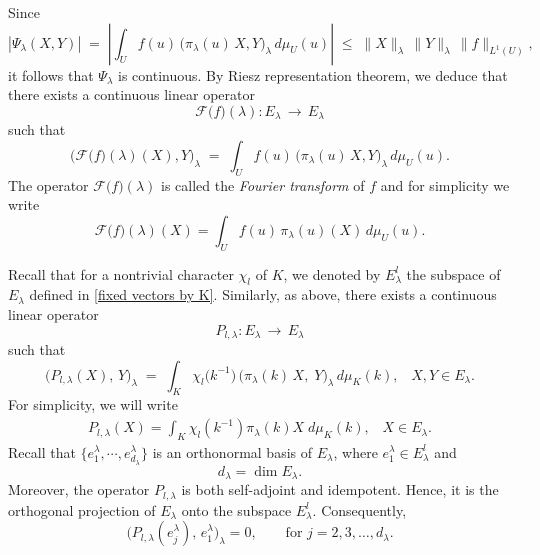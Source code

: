 \documentclass[11pt,a4paper]{amsart}
\theoremstyle{definition}
\numberwithin{equation}{section}
\begin{document}
 Since
\[
|\Psi_\lambda(X,Y)| \;=\; \left|\int_U f(u)\,\bigl( \pi_{\lambda}(u)\,X, Y \bigr)_\lambda \, d\mu_U(u)\right|
\;\le\; \|X\|_{\lambda} \,\|Y\|_{\lambda} \,\|f\|_{L^1(U)},
\]
it follows that $\Psi_\lambda$ is continuous. By Riesz representation theorem, we deduce that there exists a continuous linear operator 
\[
\mathcal{F}\bigl(f\bigr)(\lambda)\colon E_{\lambda} \,\longrightarrow\, E_{\lambda}
\]
such that
\[
\bigl( \mathcal{F}\bigl(f\bigr)(\lambda)(X), Y\bigr)_\lambda \;=\; 
\int_U f(u)\,\bigl( \pi_{\lambda}(u)\,X, Y\bigr)_\lambda \,d\mu_U(u).
\]
The operator $\mathcal{F}\bigl(f\bigr)(\lambda)$ is called the \emph{Fourier transform} of $f$ and for simplicity we write
\[
 \mathcal{F}\bigl(f\bigr)(\lambda)\left( X\right) =\int_U f(u)\, \pi_{\lambda}(u)\left( X\right) \,d\mu_U(u).
\]


 













Recall that for a nontrivial character $\chi_l$ of $K$, we denoted by $E_\lambda^l$ the subspace of $E_\lambda$ defined in \eqref{fixed vectors by K}. 
Similarly, as above, there exists a continuous linear operator 
\[
P_{l,\lambda}\colon E_{\lambda}\,\longrightarrow\,E_{\lambda}
\]
such that
\[
 \bigl( P_{l,\lambda}(X),\,Y\bigr)_\lambda 
\;=\;
\int_K \chi_l\bigl(k^{-1}\bigr)\,\bigl(\pi_\lambda(k)\,X,\; Y\bigr)_\lambda \, d\mu_K(k) ,\,\,\,\,\, X,Y\in E_\lambda.
\]
For simplicity, we will write
\begin{align*}
	P_{l, \lambda} (X) =\int_K \chi_l(k^{-1}) \pi_\lambda(k) X\;d\mu_K(k) , \;\;\; X\in E_\lambda.
\end{align*}
Recall that $\lbrace e_1^\lambda , \cdots , e^\lambda_{d_\lambda}\rbrace$   is  an orthonormal basis  of $ E_\lambda$, where  $ e_1^\lambda \in E_\lambda^l$ and  \\ $$d_\lambda=\dim E_\lambda .$$
\vspace{0.3em}
\noindent
Moreover, the operator \( P_{l,\lambda} \) is both self-adjoint and idempotent. Hence, it is the orthogonal projection of \( E_\lambda \) onto the subspace \( E_\lambda^l \). Consequently,
\[
\bigl(P_{l,\lambda}(e_j^\lambda),\, e_1^\lambda \bigr)_\lambda = 0,
\qquad \text{for } j = 2, 3, \dots, d_\lambda .
\]
\end{document}
